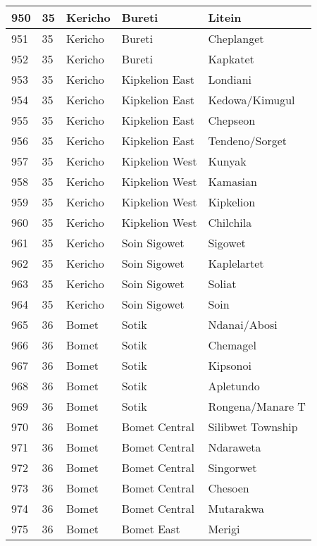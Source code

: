 \begin{table}[!ht]
\begin{tabular}{|l|l|l|l|l|}
        950 & 35 & Kericho & Bureti & Litein \\ \hline
        951 & 35 & Kericho & Bureti & Cheplanget \\ \hline
        952 & 35 & Kericho & Bureti & Kapkatet \\ \hline
        953 & 35 & Kericho & Kipkelion East & Londiani \\ \hline
        954 & 35 & Kericho & Kipkelion East & Kedowa/Kimugul \\ \hline
        955 & 35 & Kericho & Kipkelion East & Chepseon \\ \hline
        956 & 35 & Kericho & Kipkelion East & Tendeno/Sorget \\ \hline
        957 & 35 & Kericho & Kipkelion West & Kunyak \\ \hline
        958 & 35 & Kericho & Kipkelion West & Kamasian \\ \hline
        959 & 35 & Kericho & Kipkelion West & Kipkelion \\ \hline
        960 & 35 & Kericho & Kipkelion West & Chilchila \\ \hline
        961 & 35 & Kericho & Soin Sigowet & Sigowet \\ \hline
        962 & 35 & Kericho & Soin Sigowet & Kaplelartet \\ \hline
        963 & 35 & Kericho & Soin Sigowet & Soliat \\ \hline
        964 & 35 & Kericho & Soin Sigowet & Soin \\ \hline
        965 & 36 & Bomet & Sotik & Ndanai/Abosi \\ \hline
        966 & 36 & Bomet & Sotik & Chemagel \\ \hline
        967 & 36 & Bomet & Sotik & Kipsonoi \\ \hline
        968 & 36 & Bomet & Sotik & Apletundo \\ \hline
        969 & 36 & Bomet & Sotik & Rongena/Manare T \\ \hline
        970 & 36 & Bomet & Bomet Central & Silibwet Township \\ \hline
        971 & 36 & Bomet & Bomet Central & Ndaraweta \\ \hline
        972 & 36 & Bomet & Bomet Central & Singorwet \\ \hline
        973 & 36 & Bomet & Bomet Central & Chesoen \\ \hline
        974 & 36 & Bomet & Bomet Central & Mutarakwa \\ \hline
        975 & 36 & Bomet & Bomet East & Merigi \\ \hline

\end{tabular}
\end{table}
